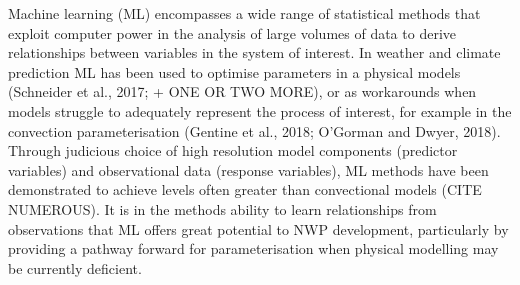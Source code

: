 \documentclass[twocol]{ametsoc}
\begin{document}
Machine learning (ML) encompasses a wide range of statistical methods that exploit computer power in the analysis of large volumes of data to derive relationships between variables in the system of interest.  In weather and climate prediction ML has been used to optimise parameters in a physical models (Schneider et al., 2017; + ONE OR TWO MORE),  or as workarounds when models struggle to adequately represent the process of interest, for example in the convection parameterisation (Gentine et al., 2018; O’Gorman and Dwyer, 2018). Through judicious choice of high resolution model components (predictor variables) and observational data (response variables), ML methods have been demonstrated to achieve levels often greater than convectional models (CITE NUMEROUS). It is in the methods ability to learn relationships from observations that ML offers great potential to NWP development, particularly by providing a pathway forward for parameterisation when physical modelling may be currently deficient.



\end{document}
